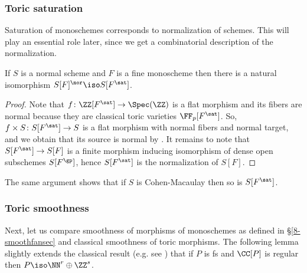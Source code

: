 \documentclass[10pt]{../fichiers-configuration-latex/smfart}
\begin{document}
\subsubsection{Toric saturation}\label{8-toricsatsec} Saturation of
monoschemes corresponds to normalization of schemes. This will play
an essential role later, since we get a combinatorial description
of the normalization.

\begin{lemma2}\label{8-toricsatlem} If $S$ is a normal scheme
and $F$ is a fine monoscheme then there is a natural isomorphism
$S[F]^\nor\iso S[F^\sat]$.  \end{lemma2} \begin{proof} Note
that $f{\colon}\ZZ[F^\sat]\to\Spec(\ZZ)$ is a flat morphism and
its fibers are normal because  they are classical toric varieties
$\FF_p[F^\sat]$. So, $f\times S{\colon}S[F^\sat]\to S$ is a flat
morphism with normal fibers and normal target, and we obtain that
its source is normal by \cite[21.E(iii)]{CA@Matsumura}. It remains
to note that $S[F^\sat]\to S[F]$ is a finite morphism inducing
isomorphism of dense open subschemes $S[F^\gp]$, hence $S[F^\sat]$
is the normalization of $S[F]$.  \end{proof}

\begin{remark2} The same argument shows that if $S$ is Cohen-Macaulay
then so is $S[F^\sat]$.  \end{remark2}

\subsubsection{Toric smoothness}\label{8-toricsmoothsec} Next,
let us compare smoothness of morphisms of monoschemes as defined
in \S\ref{8-smoothfansec} and classical smoothness of toric
morphisms. The following lemma slightly extends the classical result
(e.g. see \cite[\S2.1]{Toric@Fulton}) that if $P$ is fs and $\CC[P]$
is regular then $P\iso\NN^r\oplus\ZZ^s$.
\end{document}
